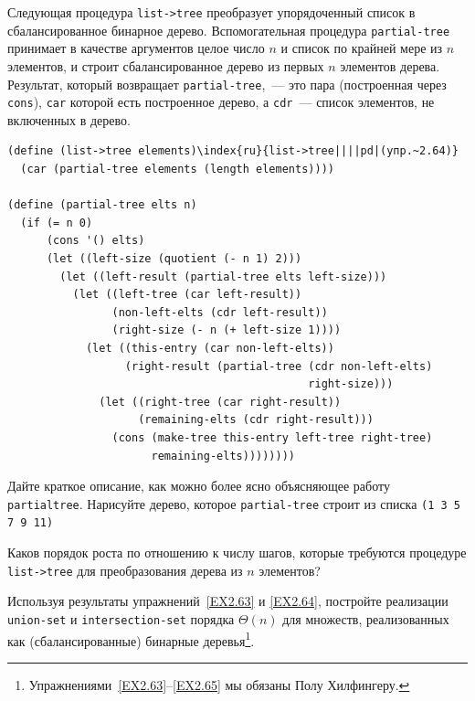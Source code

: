 \begin{exercise}{2.64}\label{EX2.64}%
%
% 
Следующая процедура {\tt list->tree}
преобразует упорядоченный список в сбалансированное
бинарное дерево. 
Вспомогательная процедура {\tt partial-tree} принимает в
качестве аргументов целое число $n$ и список по крайней
мере из $n$ элементов, и строит сбалансированное дерево из
первых $n$ элементов дерева.  Результат, который 
возвращает {\tt partial-tree},~--- это пара (построенная через
{\tt cons}), {\tt car} которой есть построенное дерево,
а {\tt cdr}~--- список элементов, не включенных в дерево.

\begin{Verbatim}[fontsize=\small]
(define (list->tree elements)\index{ru}{list->tree||||pd|(упр.~2.64)}
  (car (partial-tree elements (length elements))))

(define (partial-tree elts n)
  (if (= n 0)
      (cons '() elts)
      (let ((left-size (quotient (- n 1) 2)))
        (let ((left-result (partial-tree elts left-size)))
          (let ((left-tree (car left-result))
                (non-left-elts (cdr left-result))
                (right-size (- n (+ left-size 1))))
            (let ((this-entry (car non-left-elts))
                  (right-result (partial-tree (cdr non-left-elts)
                                              right-size)))
              (let ((right-tree (car right-result))
                    (remaining-elts (cdr right-result)))
                (cons (make-tree this-entry left-tree right-tree)
                      remaining-elts))))))))
\end{Verbatim}

\begin{plainenum}

\item
Дайте краткое описание, как можно более ясно
объясняющее работу {\tt partial\-tree}.  Нарисуйте дерево,
которое {\tt partial-tree} строит из списка {\tt (1 3 5 7 9 11)}

\item
Каков порядок роста по отношению к числу шагов,
которые требуются процедуре \linebreak
\mbox{{\tt list->tree}} для преобразования
дерева из $n$ элементов?
\end{plainenum}
\end{exercise}
\begin{exercise}{2.65}\label{EX2.65}%
Используя результаты упражнений~\ref{EX2.63}
и \ref{EX2.64}, постройте реализации {\tt union-set} и {\tt in\-ter\-sec\-tion-set}
порядка $\Theta (n)$ для
множеств, реализованных как (сбалансированные) бинарные деревья\footnote{Упражнениями~\ref{EX2.63}--\ref{EX2.65} мы обязаны  Полу Хилфингеру.
}.
\end{exercise}%

